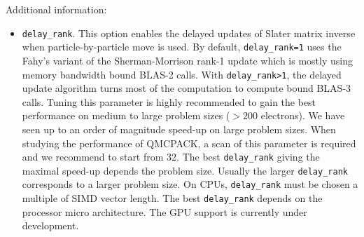 Additional information:
\begin{itemize}
\item \texttt{delay\_rank}. This option enables the delayed updates of Slater matrix inverse when particle-by-particle move is used.
By default, \texttt{delay\_rank=1} uses the Fahy's variant of the Sherman-Morrison rank-1 update which is mostly using memory bandwidth bound BLAS-2 calls.
With \texttt{delay\_rank>1}, the delayed update algorithm turns most of the computation to compute bound BLAS-3 calls.
Tuning this parameter is highly recommended to gain the best performance on medium to large problem sizes ($>200$ electrons).
We have seen up to an order of magnitude speed-up on large problem sizes.
When studying the performance of QMCPACK, a scan of this parameter is required and we recommend to start from 32.
The best \texttt{delay\_rank} giving the maximal speed-up depends the problem size.
Usually the larger \texttt{delay\_rank} corresponds to a larger problem size.
On CPUs, \texttt{delay\_rank} must be chosen a multiple of SIMD vector length. The best \texttt{delay\_rank} depends on the processor micro architecture.
The GPU support is currently under development.
\end{itemize}

